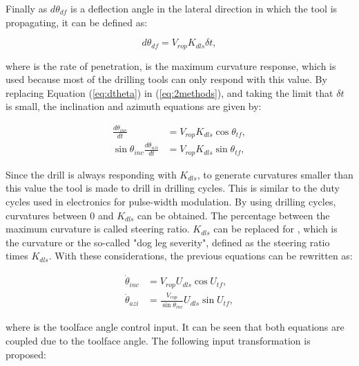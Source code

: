 Finally as $d\theta_{df}$ is a deflection angle in the lateral direction in which the tool is propagating, it can be defined as:

\begin{equation}\label{eq:dtheta}
	d\theta_{df} = V_{rop}K_{dls}\delta t,
\end{equation}

where  is the rate of penetration,  is the maximum curvature response, which is used because most of the drilling tools can only respond with this value. By replacing Equation (\ref{eq:dtheta}) in (\ref{eq:2methods}), and taking the limit that $\delta t$ is small, the inclination and azimuth equations are given by:

\begin{align}
\frac{d\theta_{inc}}{dt} & =  V_{rop} K_{dls} \cos{\theta_{tf}}, \\
\sin{\theta_{inc}} \frac{d\theta_{azi}}{dt} & =  V_{rop} K_{dls} \sin{\theta_{tf}},
\end{align}

Since the drill is always responding with $K_{dls}$, to generate curvatures smaller than this value the tool is made to drill in drilling cycles. This is similar to the duty cycles used in electronics for pulse-width modulation. By using drilling cycles, curvatures between 0 and $K_{dls}$ can be obtained. The percentage between the maximum curvature is called steering ratio. $K_{dls}$ can be replaced for , which is the curvature or the so-called "dog leg severity", defined as the steering ratio times $K_{dls}$. With these considerations, the previous equations can be rewritten as: 
 

\begin{align}
	\dot{\theta}_{inc} & =  V_{rop} U_{dls} \cos{U_{tf}}\label{eq:KinMod1}, \\
	\dot{\theta}_{azi} & =  \frac{V_{rop}}{\sin{\theta_{inc}}} U_{dls} \sin{U_{tf}}\label{eq:KinMod2},
\end{align}

where  is the toolface angle control input. It can be seen that both equations are coupled due to the toolface angle. The following input transformation is proposed:


